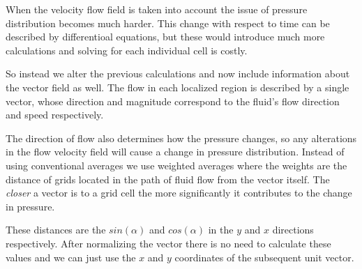 \documentclass[12pt, titlepage]{article}
\begin{document}
When the velocity flow field is taken into account the issue of pressure distribution becomes much harder. This change with respect to time can be described by differentioal equations, but these would introduce much more calculations and solving for each individual cell is costly.

\begin{center}
\end{center}

So instead we alter the previous calculations and now include information about the vector field as well. The flow in each localized region is described by a single vector, whose direction and magnitude correspond to the fluid's flow direction and speed respectively.

\bigskip

The direction of flow also determines how the pressure changes, so any alterations in the flow velocity field will cause a change in pressure distribution.
Instead of using conventional averages we use weighted averages where the weights are the distance of grids located in the path of fluid flow from the vector itself.
The \textit{closer} a vector is to a grid cell the more significantly it contributes to the change in pressure. 

These distances are the $sin(\alpha)$ and $cos(\alpha)$ in the $y$ and $x$ directions respectively. After normalizing the vector there is no need to calculate these values and we can just use the $x$ and $y$ coordinates of the subsequent unit vector.
\end{document}
